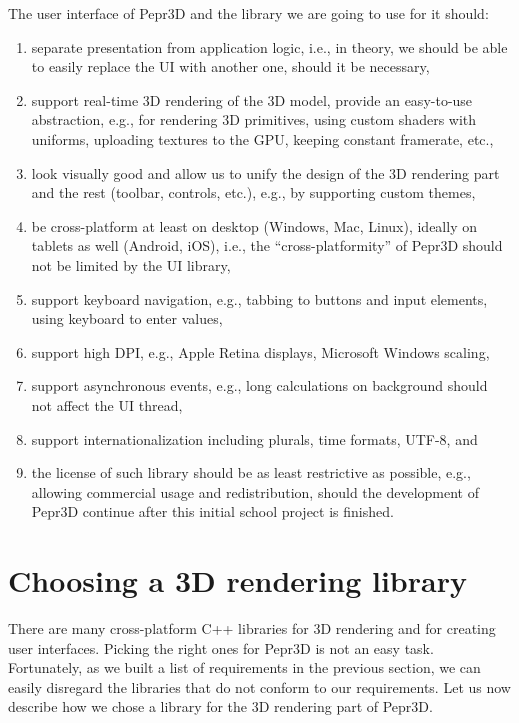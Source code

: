 The user interface of Pepr3D and the library we are going to use for it should:
%
\begin{enumerate}
\setlength\itemsep{0em}
\item separate presentation from application logic, i.e., in theory, we should be able to easily replace the UI with another one, should it be necessary,
\item support real-time 3D rendering of the 3D model, provide an easy-to-use abstraction, e.g., for rendering 3D primitives, using custom shaders with uniforms, uploading textures to the GPU, keeping constant framerate, etc.,
\item look visually good and allow us to unify the design of the 3D rendering part and the rest (toolbar, controls, etc.), e.g., by supporting custom themes,
\item be cross-platform at least on desktop (Windows, Mac, Linux), ideally on tablets as well (Android, iOS), i.e., the ``cross-platformity'' of Pepr3D should not be limited by the UI library,
\item support keyboard navigation, e.g., tabbing to buttons and input elements, using keyboard to enter values,
\item support high DPI, e.g., Apple Retina displays, Microsoft Windows scaling,
\item support asynchronous events, e.g., long calculations on background should not affect the UI thread,
\item support internationalization including plurals, time formats, UTF-8, and
\item the license of such library should be as least restrictive as possible, e.g., allowing commercial usage and redistribution, should the development of Pepr3D continue after this initial school project is finished.
\end{enumerate}

\section{Choosing a 3D rendering library}

There are many cross-platform C++ libraries for 3D rendering and for creating user interfaces.
Picking the right ones for Pepr3D is not an easy task.
Fortunately, as we built a list of requirements in the previous section, we can easily disregard the libraries that do not conform to our requirements.
Let us now describe how we chose a library for the 3D rendering part of Pepr3D.

